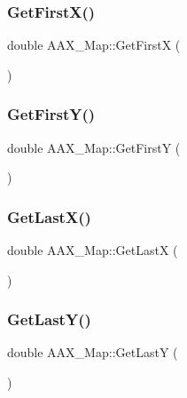 \mbox{\label{a01981_a1933116dc2522c0d2196ed36c2d99bcc}} 
\subsubsection{\texorpdfstring{GetFirstX()}{GetFirstX()}}
{\footnotesize\ttfamily double A\+A\+X\+\_\+\+Map\+::\+Get\+FirstX (\begin{DoxyParamCaption}{ }\end{DoxyParamCaption})\hspace{0.3cm}{\ttfamily [inline]}}

\mbox{\label{a01981_aa41cd9f24307874e62e07f75d637dde6}} 
\subsubsection{\texorpdfstring{GetFirstY()}{GetFirstY()}}
{\footnotesize\ttfamily double A\+A\+X\+\_\+\+Map\+::\+Get\+FirstY (\begin{DoxyParamCaption}{ }\end{DoxyParamCaption})\hspace{0.3cm}{\ttfamily [inline]}}

\mbox{\label{a01981_a8f3190a633e010e6f521b8582705e29b}} 
\subsubsection{\texorpdfstring{GetLastX()}{GetLastX()}}
{\footnotesize\ttfamily double A\+A\+X\+\_\+\+Map\+::\+Get\+LastX (\begin{DoxyParamCaption}{ }\end{DoxyParamCaption})\hspace{0.3cm}{\ttfamily [inline]}}

\mbox{\label{a01981_add422d45b54cd4c109a5764434bbe6d6}} 
\subsubsection{\texorpdfstring{GetLastY()}{GetLastY()}}
{\footnotesize\ttfamily double A\+A\+X\+\_\+\+Map\+::\+Get\+LastY (\begin{DoxyParamCaption}{ }\end{DoxyParamCaption})\hspace{0.3cm}{\ttfamily [inline]}}

